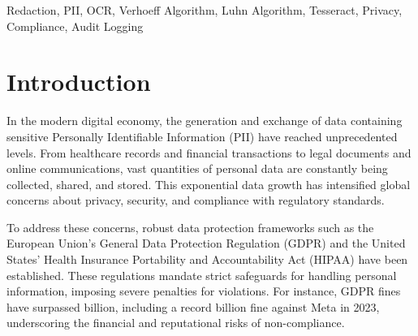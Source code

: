 \documentclass[conference]{IEEEtran}
\begin{document}
\begin{abstract}
The rapid expansion of digital information across text and images has made automated redaction essential for safeguarding personally identifiable information (PII) and ensuring regulatory compliance. This paper presents RE-DACT, an AI-driven web platform that automates the detection and masking of sensitive Indian identity documents---Aadhaar UIDs, PAN cards, and payment card numbers---from PDF and image files. The system employs a multi-stage pipeline combining Optical Character Recognition (OCR) via Tesseract with algorithmic checksum validation (Verhoeff and Luhn algorithms) and structural pattern matching. A novel multi-orientation scanning approach tests eight preprocessing combinations (four rotations and two blur states) to handle arbitrarily oriented documents, achieving sub-300\,ms processing times for single-page images. The platform features three configurable masking levels, a tamper-evident SHA-256 hash-chain audit log, and a zero-data-retention architecture. Empirical evaluation on real documents demonstrates reliable Aadhaar detection with processing times between 274--1582\,ms depending on document complexity. RE-DACT bridges critical gaps in existing tools by combining checksum-validated detection, multi-orientation robustness, and enterprise-grade audit logging in a unified, open-source web interface.
\end{abstract}


\begin{IEEEkeywords}
Redaction, PII, OCR, Verhoeff Algorithm, Luhn Algorithm, Tesseract, Privacy, Compliance, Audit Logging
\end{IEEEkeywords}


\section{Introduction}

In the modern digital economy, the generation and exchange of data containing sensitive Personally Identifiable Information (PII) have reached unprecedented levels. From healthcare records and financial transactions to legal documents and online communications, vast quantities of personal data are constantly being collected, shared, and stored. This exponential data growth has intensified global concerns about privacy, security, and compliance with regulatory standards.

To address these concerns, robust data protection frameworks such as the European Union's General Data Protection Regulation (GDPR) and the United States' Health Insurance Portability and Accountability Act (HIPAA) have been established. These regulations mandate strict safeguards for handling personal information, imposing severe penalties for violations. For instance, GDPR fines have surpassed  billion, including a record  billion fine against Meta in 2023, underscoring the financial and reputational risks of non-compliance.
\end{document}
